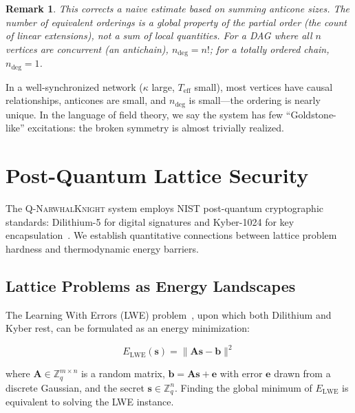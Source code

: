 \documentclass[12pt,a4paper,twocolumn]{article}
\newtheorem{remark}{Remark}
\newcommand{\qnk}{\textsc{Q-NarwhalKnight}}
\newcommand{\kparam}{\kappa}
\newcommand{\Teff}{T_{\mathrm{eff}}}
\begin{document}
\begin{remark}
This corrects a naive estimate based on summing anticone sizes. The number of equivalent orderings is a global property of the partial order (the count of linear extensions), not a sum of local quantities. For a DAG where all $n$ vertices are concurrent (an antichain), $n_{\mathrm{deg}} = n!$; for a totally ordered chain, $n_{\mathrm{deg}} = 1$.
\end{remark}

In a well-synchronized network ($\kparam$ large, $\Teff$ small), most vertices have causal relationships, anticones are small, and $n_{\mathrm{deg}}$ is small---the ordering is nearly unique. In the language of field theory, we say the system has few ``Goldstone-like'' excitations: the broken symmetry is almost trivially realized.

\section{Post-Quantum Lattice Security}
\label{sec:postquantum}

The \qnk{} system employs NIST post-quantum cryptographic standards: Dilithium-5 for digital signatures and Kyber-1024 for key encapsulation~\cite{dilithium,kyber}. We establish quantitative connections between lattice problem hardness and thermodynamic energy barriers.

\subsection{Lattice Problems as Energy Landscapes}

The Learning With Errors (LWE) problem~\cite{lattice}, upon which both Dilithium and Kyber rest, can be formulated as an energy minimization:

\begin{equation}
E_{\mathrm{LWE}}(\mathbf{s}) = \|\mathbf{A}\mathbf{s} - \mathbf{b}\|^2
\end{equation}

where $\mathbf{A} \in \mathbb{Z}_q^{m \times n}$ is a random matrix, $\mathbf{b} = \mathbf{A}\mathbf{s} + \mathbf{e}$ with error $\mathbf{e}$ drawn from a discrete Gaussian, and the secret $\mathbf{s} \in \mathbb{Z}_q^n$. Finding the global minimum of $E_{\mathrm{LWE}}$ is equivalent to solving the LWE instance.
\end{document}
